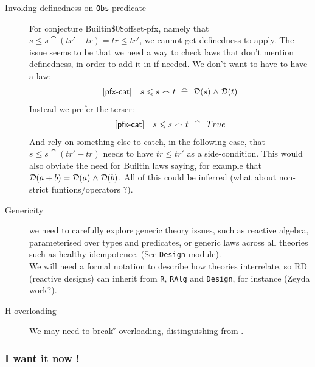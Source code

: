 \begin{description}
  \item[Invoking definedness on \texttt{Obs} predicate]
   For conjecture Builtin\$0\$offset-pfx, namely that $ s \leq s\cat(tr'-tr) = tr \leq tr'$,
   we cannot get definedness to apply.
   The issue seems to be that we need a way to check laws that don't mention
   definedness, in order to add it in if needed.
   We don't want to have to have a law:
   \begin{eqnarray*}
     [\textsf{pfx-cat}] && s \leqslant s \frown t \mathrel{~\widehat{=\!\!\!\!=}}~ \mathcal D(s) \mathrel{\wedge} \mathcal D(t)
   \end{eqnarray*}
   Instead we prefer the terser:
   \begin{eqnarray*}
     [\textsf{pfx-cat}] && s \leqslant s \frown t \mathrel{~\widehat{=\!\!\!\!=}}~ True
   \end{eqnarray*}
   And rely on something else to catch, in the following case, that
   $s \le s \cat (tr'-tr)$ needs to have $tr \le tr'$ as a side-condition.
   This would also obviate the need for Builtin laws
   saying, for example that $\mathcal D(a+b) = \mathcal D(a) \mathrel{\wedge} \mathcal D(b)$.
   All of this could be inferred (what about non-strict funtions/operators ?).
  \item[Genericity]
    we need to carefully explore generic theory issues,
    such as reactive algebra, parameterised over types and predicates,
    or generic laws across all theories such as healthy idempotence.
    (See \texttt{Design} module).
    \\
    We will need a formal notation to describe how theories interrelate,
    so RD (reactive designs) can inherit from
    \texttt{R}, \texttt{RAlg} and \texttt{Design}, for instance (Zeyda work?).
  \item[H-overloading]
    We may need to break \H{}-overloading, distinguishing \mkH{} from \isH{}.
\end{description}


\subsubsection{I want it now !}

